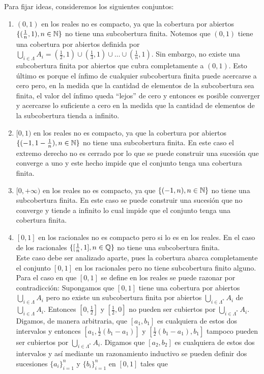 \begin{ejemplo}Para fijar ideas, consideremos los siguientes conjuntos:
\begin{enumerate}
\item $(0,1)$ en los reales no es compacto, ya que la cobertura por abiertos $\{(\frac{1}{n},1),n\in \mathbb{N}\}$  no tiene una subcobertura finita. Notemos que $(0,1)$ tiene una cobertura por abiertos definida por $\bigcup_{i\in \Lambda} A_i = (\frac{1}{2},1)\cup (\frac{1}{3},1)\cup \ldots \cup (\frac{1}{n},1)$. Sin embargo, no existe una subcobertura finita por abiertos que cubra completamente a $(0,1)$. Esto \'ultimo es porque el \'infimo de cualquier subcobertura finita puede acercarse a cero pero, en la medida que la cantidad de elementos de la subcobertura sea finita, el valor del \'infimo queda ``lejos'' de cero y entonces es posible converger y acercarse lo suficiente a cero en la medida que la cantidad de elementos de la subcobertura tienda a infinito.
\item $[0, 1)$ en los reales no es compacto, ya que la cobertura por abiertos $\{(-1,1-\frac{1}{n}),n\in \mathbb{N}\}$ no tiene una subcobertura finita. En este caso el extremo derecho no es cerrado por lo que se puede construir una sucesi\'on que converge a uno y este hecho impide que el conjunto tenga una cobertura finita.
\item $[0,+\infty)$ en los reales no es compacto, ya que $\{(-1,n),n\in \mathbb{N}\}$ no tiene una subcobertura finita. En este caso se puede construir una sucesi\'on que no converge y tiende a infinito lo cual impide que el conjunto tenga una cobertura finita.
\item $[0,1]$ en los racionales no es compacto pero si lo es en los reales. En el caso de los racionales $\{[\frac{1}{n},1],n\in \mathbb{Q}\}$ no tiene una subcobertura finita.
\\ Este caso debe ser analizado aparte, pues la cobertura abarca completamente el conjunto $[0,1]$ en los racionales pero no tiene subcobertura finito alguno. Para el caso en que $[0,1]$ se define en los reales se puede razonar por contradicci\'on: Supongamos que $[0,1]$ tiene una cobertura por abiertos $\bigcup_{i\in \Lambda} A_i$ pero no existe un subcobertura finita por abiertos $\bigcup_{i\in \Lambda^*} A_i$ de $\bigcup_{i\in \Lambda} A_i$. Entonces $[0,\frac{1}{2}]$ y $[\frac{1}{2},0]$ no pueden ser cubiertos por $\bigcup_{i\in \Lambda^*} A_i$. Digamos, de manera arbitraria, que $[a_1,b_1]$ es cualquiera de estos dos intervalos y entonces $[a_1,\frac{1}{2}(b_1-a_1)]$ y $[\frac{1}{2}(b_1-a_1),b_1]$ tampoco pueden ser cubiertos por $\bigcup_{i\in \Lambda^*} A_i$. Digamos que $[a_2,b_2]$ es cualquiera de estos dos intervalos y as\'i mediante un razonamiento inductivo se pueden definir dos sucesiones $\{a_i\}_{i=1}^n$ y $\{b_i\}_{i=1}^n$ en $[0,1]$ tales que

\end{enumerate}
\end{ejemplo}
